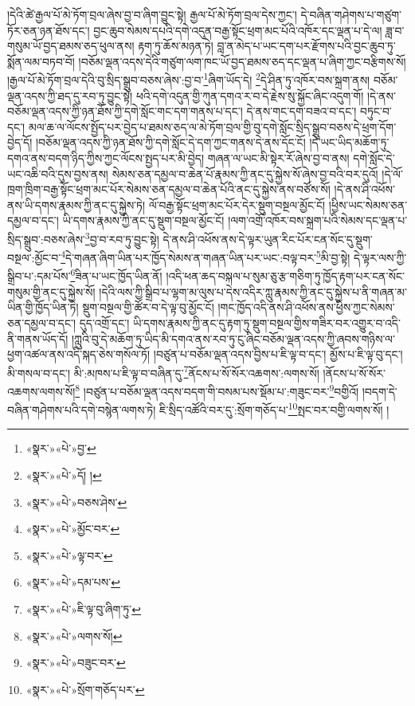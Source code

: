།དེའི་ཚེ་རྒྱལ་པོ་མེ་ཏོག་བྲལ་ཞེས་བྱ་བ་ཞིག་བྱུང་སྟེ། རྒྱལ་པོ་མེ་ཏོག་བྲལ་དེས་ཀྱང་། དེ་བཞིན་གཤེགས་པ་གཙུག་ཏོར་ཅན་ཉན་ཐོས་དང་། བྱང་ཆུབ་སེམས་དཔའི་དགེ་འདུན་བརྒྱ་སྟོང་ཕྲག་མང་པོའི་འཁོར་དང་ལྡན་པ་དེ་ལ། ཟླ་བ་གསུམ་ཡོ་བྱད་ཐམས་ཅད་ཕུལ་ནས། རྟག་ཏུ་ཆོས་མཉན་ཏེ། བླ་ན་མེད་པ་ཡང་དག་པར་རྫོགས་པའི་བྱང་ཆུབ་ཏུ་སྨོན་ལམ་བཏབ་བོ། །བཅོམ་ལྡན་འདས་དེའི་གཙུག་ལག་ཁང་ཡོ་བྱད་ཐམས་ཅད་དང་ལྡན་པ་ཞིག་ཀྱང་བརྩིགས་སོ། །རྒྱལ་པོ་མེ་ཏོག་བྲལ་དེའི་བུ་སྲིད་སྒྲུབ་བཅས་ཞེས་:བྱ་བ་\footnote{«སྣར་»«པེ་»བྱ་}ཞིག་ཡོད་དེ། \footnote{«སྣར་»«པེ་»དོ། ། }དེ་ཤིན་ཏུ་འཁོར་བས་སྐྲག་ནས། བཅོམ་ལྡན་འདས་ཀྱི་ཐད་དུ་རབ་ཏུ་བྱུང་སྟེ། ཕའི་དགེ་འདུན་གྱི་ཀུན་དགའ་ར་བ་དེ་རྗེས་སུ་སྐྱོང་ཞིང་འདུག་གོ། །དེ་ནས་བཅོམ་ལྡན་འདས་ཀྱི་ཉན་ཐོས་ཀྱི་དགེ་སློང་གང་དག་གནས་པ་དང་། དེ་ནས་གང་དག་བཟའ་བ་དང་། བཏུང་བ་དང་། མལ་ཆ་ལ་ལོངས་སྤྱོད་པར་བྱེད་པ་ཐམས་ཅད་ལ་མེ་ཏོག་བྲལ་གྱི་བུ་དགེ་སློང་སྲིད་སྒྲུབ་བཅས་དེ་ཕྲག་དོག་བྱེད་དོ། །བཅོམ་ལྡན་འདས་ཀྱི་ཉན་ཐོས་ཀྱི་དགེ་སློང་དེ་དག་ཀྱང་གནས་དེ་ནས་དོང་ངོ། །དེ་ཡང་ཡིད་མཆོག་ཏུ་དགའ་ནས་བདག་ཉིད་ཀྱིས་ཀྱང་ལོངས་སྤྱད་པར་མི་བྱེད། གཞན་ལ་ཡང་མི་སྟེར་རོ་ཞེས་བྱ་བ་ནས། དགེ་སློང་དེ་ཡང་འཆི་བའི་དུས་བྱས་ནས། སེམས་ཅན་དམྱལ་བ་ཆེན་པོ་རྣམས་ཀྱི་ནང་དུ་སྐྱེས་སོ་ཞེས་བྱ་བའི་བར་དུའོ། །དེ་ལོ་ཁྲག་ཁྲིག་བརྒྱ་སྟོང་ཕྲག་མང་པོར་སེམས་ཅན་དམྱལ་བ་ཆེན་པོའི་ནང་དུ་སྐྱེས་ནས་བཙོས་སོ། །དེ་ནས་ཤི་འཕོས་ནས་ཡི་དགས་རྣམས་ཀྱི་ནང་དུ་སྐྱེས་ཏེ། ལོ་བརྒྱ་སྟོང་ཕྲག་མང་པོར་དེར་སྡུག་བསྔལ་མྱོང་ངོ། །ཕྱིས་ཡང་སེམས་ཅན་དམྱལ་བ་དང་། ཡི་དགས་རྣམས་ཀྱི་ནང་དུ་སྡུག་བསྔལ་མྱོང་ངོ། །ལག་འགྲོ་འཁོར་བས་སྐྲག་པའི་སེམས་དང་ལྡན་པ་སྲིད་སྒྲུབ་:བཅས་ཞེས་\footnote{«སྣར་»«པེ་»བཅས་ཤེས་}བྱ་བ་རབ་ཏུ་བྱུང་སྟེ། དེ་ནས་ཤི་འཕོས་ནས་དེ་ལྟར་ཡུན་རིང་པོར་ངན་སོང་དུ་སྡུག་བསྔལ་:མྱོང་བ་\footnote{«སྣར་»«པེ་»མྱོང་བར་}དེ་གཞན་ཞིག་ཡིན་པར་ཁྱོད་སེམས་ན་གཞན་ཡིན་པར་ཡང་:བལྟ་བར་\footnote{«སྣར་»«པེ་»ལྟ་བར་}མི་བྱ་སྟེ། དེ་ལྟར་ལས་ཀྱི་སྒྲིབ་པ་:དམ་པོས་\footnote{«སྣར་»«པེ་»དམ་པས་}ཟིན་པ་ཡང་ཁྱོད་ཡིན་ནོ། །འདི་ཕན་ཆད་བསྐལ་པ་སུམ་ཅུ་རྩ་གཅིག་ཏུ་ཁྱོད་རྟག་པར་ངན་སོང་གསུམ་གྱི་ནང་དུ་སྐྱེས་སོ། །དེའི་ལས་ཀྱི་སྒྲིབ་པ་ལྷག་མ་ལུས་པ་དེས་འདིར་ཀླུ་རྣམས་ཀྱི་ནང་དུ་སྐྱེས་པ་ནི་གཞན་མ་ཡིན་གྱི་ཁྱོད་ཡིན་ཏེ། སྡུག་བསྔལ་གྱི་ཚོར་བ་དེ་ལྟ་བུ་མྱོང་ངོ། །གང་ཁྱོད་འདི་ནས་ཤི་འཕོས་ནས་ཕྱིས་ཀྱང་སེམས་ཅན་དམྱལ་བ་དང་། དུད་འགྲོ་དང་། ཡི་དགས་རྣམས་ཀྱི་ནང་དུ་རྟག་ཏུ་སྡུག་བསྔལ་གྱིས་གཟིར་བར་འགྱུར་བ་འདི་ནི་གནས་ཡོད་དོ། །ཀླུའི་བུ་དེ་མཆོག་ཏུ་ཡིད་མི་དགའ་ནས་རབ་ཏུ་ངུ་ཞིང་བཅོམ་ལྡན་འདས་ཀྱི་ཞབས་གཉིས་ལ་ཕྱག་འཚལ་ནས་འདི་སྐད་ཅེས་གསོལ་ཏོ། །བཙུན་པ་བཅོམ་ལྡན་འདས་བྱིས་པ་ཇི་ལྟ་བ་དང་། མྱོས་པ་ཇི་ལྟ་བུ་དང་། མི་གསལ་བ་དང་། མི་:མཁས་པ་ཇི་ལྟ་བ་བཞིན་དུ་\footnote{«སྣར་»«པེ་»ཇི་ལྟ་བུ་ཞིག་ཏུ་}ནོངས་པ་སོ་སོར་འཆགས་:ལགས་སོ། །ནོངས་པ་སོ་སོར་འཆགས་ལགས་སོ།\footnote{«སྣར་»«པེ་»ལགས་སོ།} །བཙུན་པ་བཅོམ་ལྡན་འདས་བདག་གི་བསམ་པས་སྡོམ་པ་:གཟུང་བར་\footnote{«སྣར་»«པེ་»བཟུང་བར་}བགྱིའོ། །བདག་དེ་བཞིན་གཤེགས་པའི་དགེ་བསྙེན་ལགས་ཏེ། ཇི་སྲིད་འཚོའི་བར་དུ་:སྲོག་གཅོད་པ་\footnote{«སྣར་»«པེ་»སྲོག་གཅོད་པར་}སྤང་བར་བགྱི་ལགས་སོ། །
